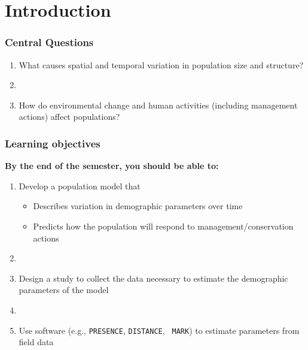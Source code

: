 \documentclass[color=usenames,dvipsnames]{beamer}
\begin{document}





\section{Introduction}


\begin{frame}
\frametitle{Central Questions}
  \large \centering
  \begin{enumerate}[\bf (1)]
    \item What causes spatial and temporal variation in population size
    and structure? \par
    \item[]
    \item<2-> How do environmental change and human activities (including
      management actions) affect populations?
  \end{enumerate}
\end{frame}



\begin{frame}
  \frametitle{Learning objectives}
  \large
  {\bf By the end of the semester, you should be able to: \\}
  \vspace{0.3cm}
  \begin{enumerate}[\bf (1)]
    \large
    \item<1-> Develop a population model that
      \begin{itemize}
        \normalsize %
        \item Describes variation in demographic parameters over time
        \item Predicts how the population will respond to
          management/conservation actions
      \end{itemize}
    \item[]
    \item<2-> Design a study to collect the data necessary to estimate
      the demographic parameters of the model
    \item[]
    \item<3-> Use software (e.g., {\tt PRESENCE}, {\tt DISTANCE}, {\tt
        MARK}) to estimate parameters from field data
  \end{enumerate}
\end{frame}
\end{document}
